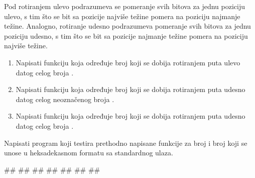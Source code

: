 \begin{Exercise}[label=205]
Pod rotiranjem ulevo podrazumeva se pomeranje svih bitova za jednu poziciju ulevo, s tim što se bit sa pozicije najviše težine pomera na poziciju najmanje težine. Analogno, rotiranje udesno podrazumeva pomeranje svih bitova za jednu poziciju udesno, s tim što se bit sa pozicije najmanje težine pomera na poziciju najviše težine.
\begin{enumerate}
\item Napisati funkciju  koja određuje broj koji se dobija rotiranjem  puta ulevo datog celog broja . 
\item Napisati funkciju  koja određuje broj koji se dobija rotiranjem  puta udesno datog celog neoznačenog broja . 
\item Napisati funkciju  koja određuje broj koji se dobija rotiranjem  puta udesno datog celog broja . 
\end{enumerate}
Napisati program koji testira prethodno napisane funkcije za broj  i broj  koji se unose u heksadekasnom formatu sa standardnog ulaza.


\begin{maxitest}
\begin{test}{1}
#\naslovUlaz#
##
#\naslovIzlaz#
##
##
##
##
\end{test}
\end{maxitest}

\end{Exercise}
\begin{Answer}[ref=205]
\end{Answer}

